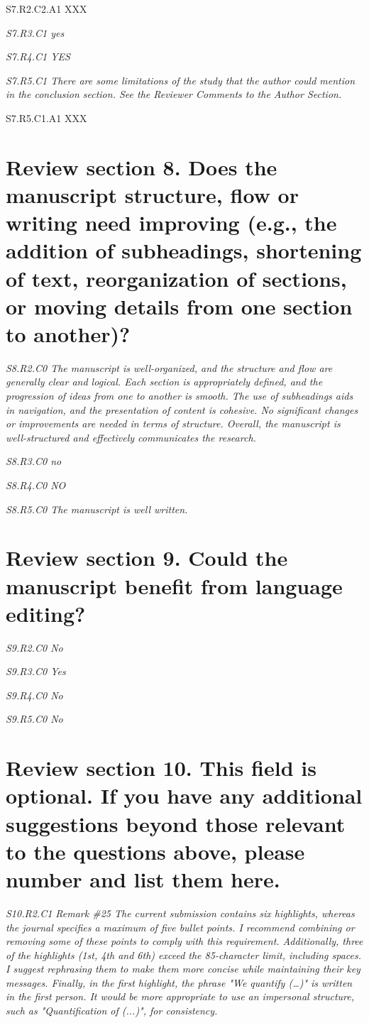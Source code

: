 \documentclass[a4paper,10pt]{article}
\begin{document}
	S7.R2.C2.A1 XXX

	\emph{S7.R3.C1 yes}

	\emph{S7.R4.C1 YES}

	\emph{S7.R5.C1 There are some limitations of the study that the author could mention in the conclusion section. See the Reviewer Comments to the Author Section.}

	S7.R5.C1.A1 XXX

	\section*{Review section 8. Does the manuscript structure, flow or writing need improving (e.g., the addition of subheadings, shortening of text, reorganization of sections, or moving details from one section to another)?}

	\emph{S8.R2.C0 The manuscript is well-organized, and the structure and flow are generally clear and logical. Each section is appropriately defined, and the progression of ideas from one to another is smooth. The use of subheadings aids in navigation, and the presentation of content is cohesive. No significant changes or improvements are needed in terms of structure. Overall, the manuscript is well-structured and effectively communicates the research.}

	\emph{S8.R3.C0 no}

	\emph{S8.R4.C0 NO}

	\emph{S8.R5.C0 The manuscript is well written.}

	\section*{Review section 9. Could the manuscript benefit from language editing?}

	\emph{S9.R2.C0 No}

	\emph{S9.R3.C0 Yes}

	\emph{S9.R4.C0 No}

	\emph{S9.R5.C0 No}

	\section*{Review section 10. This field is optional. If you have any additional suggestions beyond those relevant to the questions above, please number and list them here.}

	\emph{S10.R2.C1 Remark \#25 The current submission contains six highlights, whereas the journal specifies a maximum of five bullet points. I recommend combining or removing some of these points to comply with this requirement. Additionally, three of the highlights (1st, 4th and 6th) exceed the 85-character limit, including spaces. I suggest rephrasing them to make them more concise while maintaining their key messages. Finally, in the first highlight, the phrase "We quantify (…)" is written in the first person. It would be more appropriate to use an impersonal structure, such as "Quantification of (...)", for consistency.}
\end{document}
